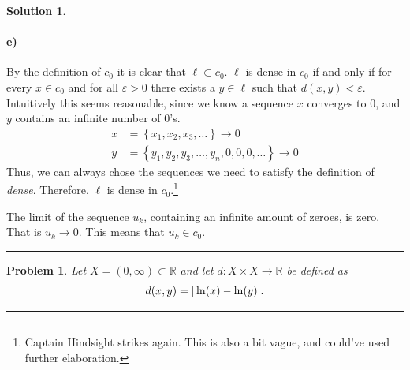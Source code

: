 \documentclass[a4paper]{article}
\newtheorem{prb}{Problem}
\theoremstyle{definition}
\newtheorem{sol}{Solution}
\newcommand{\horrule}[1]{\noindent\rule{\linewidth}{#1}}
\begin{document}
\begin{sol}
\paragraph{e)}

By the definition of $c_0$ it is clear that $\ell \subset c_0$.  $\ell$ is
dense in $c_0$ if and only if for every $x \in c_0$ and for all $\varepsilon >
0$ there exists a $y \in \ell$ such that $d(x, y) < \varepsilon$.  Intuitively
this seems reasonable, since we know a sequence $x$ converges to $0$, and $y$
contains an infinite number of $0$'s.
\begin{align*}
x &= \left\{ x_1, x_2, x_3, \ldots \right\} \longrightarrow 0\\
y &= \left\{ y_1, y_2, y_3, \ldots, y_n, 0, 0, 0, \ldots \right\} \longrightarrow 0
\end{align*}
Thus, we can always chose the sequences we need to satisfy the definition of
\textit{dense}.  Therefore, $\ell$ is dense in $c_0$.\footnote{Captain
Hindsight strikes again. This is also a bit vague, and could've used further elaboration.}

The limit of the sequence $u_k$, containing an infinite amount of zeroes, is
zero.  That is $u_k \longrightarrow 0$. This means that $u_k \in c_0$.
\end{sol}

\pagebreak
\horrule{0.5pt}
\begin{prb}
  Let $X = \left( 0, \infty \right) \subset \mathbb{R}$ and let $d : X \times X \longrightarrow \mathbb{R}$ be defined as
  \begin{equation}
    \notag
    d(x, y) = | \ln(x) - \ln(y)|.
  \end{equation}
\end{prb}
\horrule{0.5pt}
\end{document}

